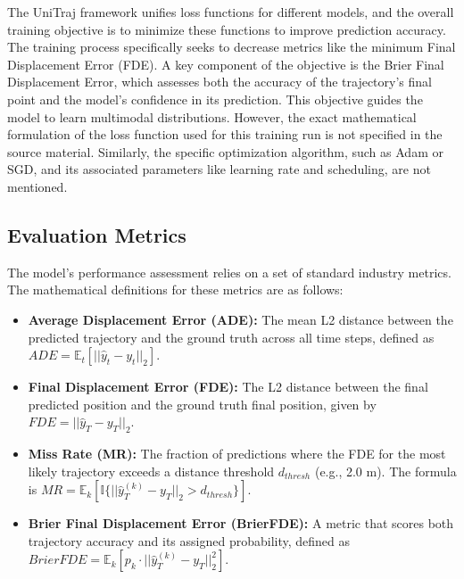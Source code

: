 The UniTraj framework unifies loss functions for different models, and the overall training objective is to minimize these functions to improve prediction accuracy. The training process specifically seeks to decrease metrics like the minimum Final Displacement Error (FDE). A key component of the objective is the Brier Final Displacement Error, which assesses both the accuracy of the trajectory's final point and the model's confidence in its prediction. This objective guides the model to learn multimodal distributions. However, the exact mathematical formulation of the loss function used for this training run is not specified in the source material. 
Similarly, the specific optimization algorithm, such as Adam or SGD, and its associated parameters like learning rate and scheduling, are not mentioned.

\subsection{Evaluation Metrics}
\label{sec:exp_metrics_merged}

The model's performance assessment relies on a set of standard industry metrics. The mathematical definitions for these metrics are as follows:
\begin{itemize}
    \item \textbf{Average Displacement Error (ADE):} The mean L2 distance between the predicted trajectory and the ground truth across all time steps, defined as $ADE=\mathbb{E}_{t}[||\hat{y}_{t}-y_{t}||_{2}]$.
    \item \textbf{Final Displacement Error (FDE):} The L2 distance between the final predicted position and the ground truth final position, given by $FDE=||\hat{y}_{T}-y_{T}||_{2}$.
    \item \textbf{Miss Rate (MR):} The fraction of predictions where the FDE for the most likely trajectory exceeds a distance threshold $d_{thresh}$ (e.g., 2.0 m). The formula is $MR=\mathbb{E}_{k}[\mathbb{I}\{||\hat{y}_{T}^{(k)}-y_{T}||_{2}>d_{thresh}\}]$.
    \item \textbf{Brier Final Displacement Error (BrierFDE):} A metric that scores both trajectory accuracy and its assigned probability, defined as $BrierFDE=\mathbb{E}_{k}[p_{k}\cdot||\hat{y}_{T}^{(k)}-y_{T}||_{2}^{2}]$.
\end{itemize}

